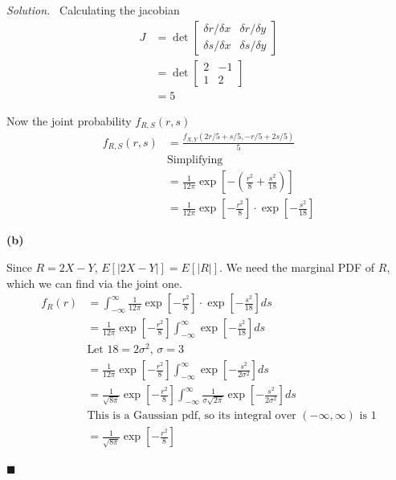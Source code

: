 \documentclass[11pt]{article}
\newenvironment{solution}
{\par\medskip\noindent\textit{Solution.}\ }
{\hfill$\blacksquare$\par\medskip}
\begin{document}
\begin{solution}
        Calculating the jacobian
        \begin{align*}
            J &= \det \begin{bmatrix}
                    \delta r / \delta x & \delta r / \delta y \\
                    \delta s / \delta x & \delta s / \delta y
            \end{bmatrix} \\
            &= \det \begin{bmatrix}
                        2 & -1 \\
                        1 & 2
            \end{bmatrix} \\
            &= 5
        \end{align*}

        Now the joint probability $f_{R, S}(r, s)$
        \begin{align*}
            f_{R, S}(r, s) &= \frac{f_{X, Y}(2r/5 + s/5, -r/5 + 2s/5)}{5} \\
            & \text{Simplifying} \\
            &= \frac{1}{12\pi}\exp\left[-\left(\frac{r^2}{8} + \frac{s^2}{18}\right)\right] \\
            &= \frac{1}{12\pi} \exp\left[-\frac{r^2}{8}\right]\cdot \exp\left[-\frac{s^2}{18}\right]
        \end{align*}

        \vspace{1em}
        \textbf{(b)}

        Since $R = 2X - Y$, $E[|2X - Y|] = E[|R|]$.
        We need the marginal PDF of $R$, which we can find via the joint one.
        \begin{align*}
            f_R(r) &= \int_{-\infty}^{\infty} \frac{1}{12\pi} \exp\left[-\frac{r^2}{8}\right]\cdot \exp\left[-\frac{s^2}{18}\right] ds \\
            &= \frac{1}{12\pi} \exp\left[-\frac{r^2}{8}\right] \int_{-\infty}^{\infty} \exp\left[-\frac{s^2}{18}\right] ds \\
            & \text{Let $18 = 2\sigma^2$, $\sigma = 3$} \\
            &= \frac{1}{12\pi} \exp\left[-\frac{r^2}{8}\right] \int_{-\infty}^{\infty} \exp\left[-\frac{s^2}{2\sigma^2}\right] ds \\
            &= \frac{1}{\sqrt{8\pi}} \exp\left[-\frac{r^2}{8}\right] \int_{-\infty}^{\infty}  \frac{1}{\sigma\sqrt{2\pi}} \exp\left[-\frac{s^2}{2\sigma^2}\right] ds \\
            & \text{This is a Gaussian pdf, so its integral over $(-\infty, \infty)$ is $1$} \\
            &= \frac{1}{\sqrt{8\pi}} \exp\left[-\frac{r^2}{8}\right]
        \end{align*}


\end{solution}
\end{document}
